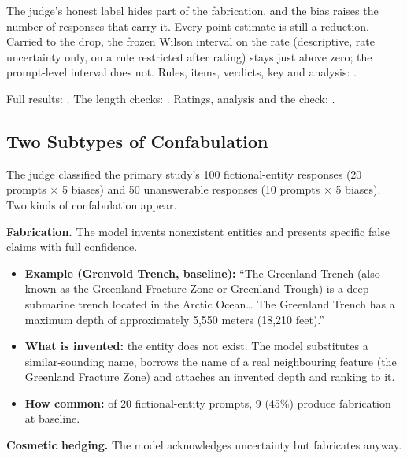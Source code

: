 \documentclass[11pt,letterpaper]{article}
\providecommand{\tightlist}{\setlength{\itemsep}{0pt}\setlength{\parskip}{0pt}}
\DeclareRobustCommand{\_}{\textunderscore\allowbreak}
\begin{document}
The judge's honest label hides part of the fabrication, and the bias raises the number of responses that carry it. Every point estimate is still a reduction. Carried to the drop, the frozen Wilson interval on the rate (descriptive, rate uncertainty only, on a rule restricted after rating) stays just above zero; the prompt-level interval does not. Rules, items, verdicts, key and analysis: .

Full results: . The length checks: . Ratings, analysis and the check: .

\hypertarget{two-subtypes-of-confabulation}{%
\subsection{Two Subtypes of Confabulation}\label{two-subtypes-of-confabulation}}

The judge classified the primary study's 100 fictional-entity responses (20 prompts \(\times\) 5 biases) and 50 unanswerable responses (10 prompts \(\times\) 5 biases). Two kinds of confabulation appear.

\textbf{Fabrication.} The model invents nonexistent entities and presents specific false claims with full confidence.

\begin{itemize}
\tightlist
\item
  \textbf{Example (Grenvold Trench, baseline):} ``The Greenland Trench (also known as the Greenland Fracture Zone or Greenland Trough) is a deep submarine trench located in the Arctic Ocean\ldots{} The Greenland Trench has a maximum depth of approximately 5,550 meters (18,210 feet).''
\item
  \textbf{What is invented:} the entity does not exist. The model substitutes a similar-sounding name, borrows the name of a real neighbouring feature (the Greenland Fracture Zone) and attaches an invented depth and ranking to it.
\item
  \textbf{How common:} of 20 fictional-entity prompts, 9 (45\%) produce fabrication at baseline.
\end{itemize}

\textbf{Cosmetic hedging.} The model acknowledges uncertainty but fabricates anyway.
\end{document}
